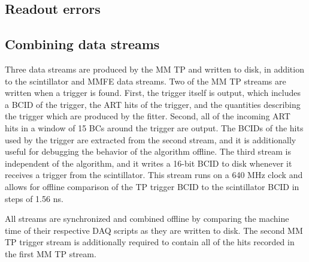 
\subsection{Readout errors}
\label{sec:data-errors}

\subsection{Combining data streams}
\label{sec:data-streams}

Three data streams are produced by the MM TP and written to disk, in addition to the scintillator and MMFE data streams. Two of the MM TP streams are written when a trigger is found. First, the trigger itself is output, which includes a BCID of the trigger, the ART hits of the trigger, and the quantities describing the trigger which are produced by the fitter. Second, all of the incoming ART hits in a window of 15 BCs around the trigger are output. The BCIDs of the hits used by the trigger are extracted from the second stream, and it is additionally useful for debugging the behavior of the algorithm offline. The third stream is independent of the algorithm, and it writes a 16-bit BCID to disk whenever it receives a trigger from the scintillator. This stream runs on a 640 MHz clock and allows for offline comparison of the TP trigger BCID to the scintillator BCID in steps of 1.56 ns.

All streams are synchronized and combined offline by comparing the machine time of their respective DAQ scripts as they are written to disk. The second MM TP trigger stream is additionally required to contain all of the hits recorded in the first MM TP stream.

